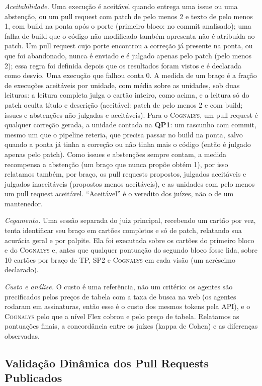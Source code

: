 \documentclass[conference]{IEEEtran}
\newcommand{\system}{\textsc{Cognalys}}
\newcommand{\researchq}[1]{\textbf{QP#1}}
\begin{document}
\emph{Aceitabilidade.} Uma execução é aceitável quando entrega uma issue ou uma
abstenção, ou um pull request com patch de pelo menos 2 e texto de pelo menos 1,
com build na ponta após o porte (primeiro bloco: no commit analisado); uma
falha de build que o código não modificado também apresenta não é atribuída ao patch. Um pull
request cujo porte encontrou a correção já presente na ponta, ou que foi abandonado, nunca
é enviado e é julgado apenas pelo patch (pelo menos 2); essa regra foi definida
depois que os resultados foram vistos e é declarada como desvio.
Uma execução que falhou conta 0. A medida de um braço é a fração de execuções aceitáveis por
unidade, com média sobre as unidades, sob duas leituras: a leitura completa julga o
cartão inteiro, como acima, e a leitura só do patch oculta título e descrição
(aceitável: patch de pelo menos 2 e com build; issues e abstenções não julgadas e
aceitáveis). Para o {\system}, um pull request é qualquer correção gerada, a unidade contada
na \researchq{1}: um rascunho com commit, mesmo um que o pipeline reteria, que
precisa passar no build na ponta, salvo quando a ponta já tinha a correção ou
não tinha mais o código (então é julgado apenas pelo patch). Como issues e abstenções sempre
contam, a medida recompensa a abstenção (um braço que nunca propõe obtém 1),
por isso relatamos também, por braço, os pull requests propostos, julgados aceitáveis e
julgados inaceitáveis (propostos menos aceitáveis), e as unidades com pelo menos um
pull request aceitável. ``Aceitável'' é o veredito dos juízes, não o de um
mantenedor.

\emph{Cegamento.} Uma sessão separada do juiz principal, recebendo um cartão por
vez, tenta identificar seu braço em cartões completos e só de patch, relatando sua
acurácia geral e por palpite. Ela foi executada sobre os cartões do primeiro bloco e do {\system}
e, antes que qualquer pontuação do segundo bloco fosse lida, sobre 10
cartões por braço de TP, SP2 e {\system} em cada visão (um acréscimo declarado).

\emph{Custo e análise.} O custo é uma referência, não um critério: os agentes são
precificados pelos preços de tabela com a taxa de busca na web (os agentes rodaram em assinaturas,
então esse é o custo dos mesmos tokens pela API), e o {\system} pelo que a
nível Flex cobrou e pelo preço de tabela. Relatamos as pontuações finais, a
concordância entre os juízes (kappa de Cohen) e as diferenças observadas.

\subsection{Validação Dinâmica dos Pull Requests Publicados}
\label{subsec:dynval}
\end{document}

